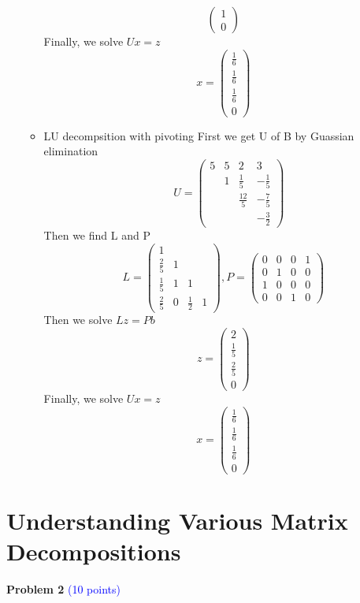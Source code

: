 \documentclass[english,onecolumn]{IEEEtran}
\begin{document}
\begin{enumerate}
\begin{itemize}
$$\begin{pmatrix}
 		1 \\ 
 		0
 		\end{pmatrix} $$
 		Finally, we solve $Ux= z$
		 $$x = \begin{pmatrix}
		\frac{1}{6} \\ 
		\frac{1}{6} \\ 
		\frac{1}{6}\\ 
		0
		\end{pmatrix} $$	
		\item LU decompsition with pivoting
		 First we get U of  B by Guassian elimination
		$$\quad U= \begin{pmatrix}
		5 & 5 & 2 &3 \\ 
		& 1 & \frac{1}{5} & -\frac{1}{5} \\ 
		&  & \frac{12}{5} & -\frac{7}{5} \\ 
		&  &  & -\frac{3}{2}
		\end{pmatrix} $$
		Then we find L and P
		$$L=\begin{pmatrix}
			1 &  &  &  \\ 
			\frac{2}{5} & 1 &  &  \\ 
			\frac{1}{5} & 1 & 1 &  \\ 
			\frac{2}{5} & 0 & \frac{1}{2} & 1
		\end{pmatrix},P =\begin{pmatrix}
		0 & 0 & 0 & 1 \\ 
		0 & 1 & 0 & 0 \\ 
		1 & 0 & 0 & 0 \\ 
		0 & 0 & 1 & 0
		\end{pmatrix} $$
		Then we solve $Lz = Pb$
		$$z = \begin{pmatrix}
		2 \\ 
		\frac{1}{5} \\ 
		\frac{2}{5} \\ 
		0
		\end{pmatrix} $$
		Finally, we solve $Ux= z$
		$$x = \begin{pmatrix}
		\frac{1}{6} \\ 
		\frac{1}{6} \\ 
		\frac{1}{6}\\ 
		0
		\end{pmatrix} $$

    \end{itemize}
\end{enumerate}

\newpage
\section{Understanding Various Matrix Decompositions}
\noindent\textbf{Problem 2} \textcolor{blue}{(10 points)}
\end{document}
